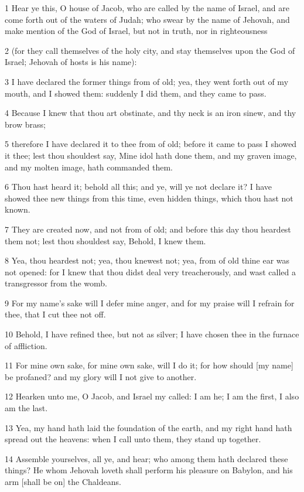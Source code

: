 \par 1 Hear ye this, O house of Jacob, who are called by the name of Israel, and are come forth out of the waters of Judah; who swear by the name of Jehovah, and make mention of the God of Israel, but not in truth, nor in righteousness
\par 2 (for they call themselves of the holy city, and stay themselves upon the God of Israel; Jehovah of hosts is his name):
\par 3 I have declared the former things from of old; yea, they went forth out of my mouth, and I showed them: suddenly I did them, and they came to pass.
\par 4 Because I knew that thou art obstinate, and thy neck is an iron sinew, and thy brow brass;
\par 5 therefore I have declared it to thee from of old; before it came to pass I showed it thee; lest thou shouldest say, Mine idol hath done them, and my graven image, and my molten image, hath commanded them.
\par 6 Thou hast heard it; behold all this; and ye, will ye not declare it? I have showed thee new things from this time, even hidden things, which thou hast not known.
\par 7 They are created now, and not from of old; and before this day thou heardest them not; lest thou shouldest say, Behold, I knew them.
\par 8 Yea, thou heardest not; yea, thou knewest not; yea, from of old thine ear was not opened: for I knew that thou didst deal very treacherously, and wast called a transgressor from the womb.
\par 9 For my name's sake will I defer mine anger, and for my praise will I refrain for thee, that I cut thee not off.
\par 10 Behold, I have refined thee, but not as silver; I have chosen thee in the furnace of affliction.
\par 11 For mine own sake, for mine own sake, will I do it; for how should [my name] be profaned? and my glory will I not give to another.
\par 12 Hearken unto me, O Jacob, and Israel my called: I am he; I am the first, I also am the last.
\par 13 Yea, my hand hath laid the foundation of the earth, and my right hand hath spread out the heavens: when I call unto them, they stand up together.
\par 14 Assemble yourselves, all ye, and hear; who among them hath declared these things? He whom Jehovah loveth shall perform his pleasure on Babylon, and his arm [shall be on] the Chaldeans.
